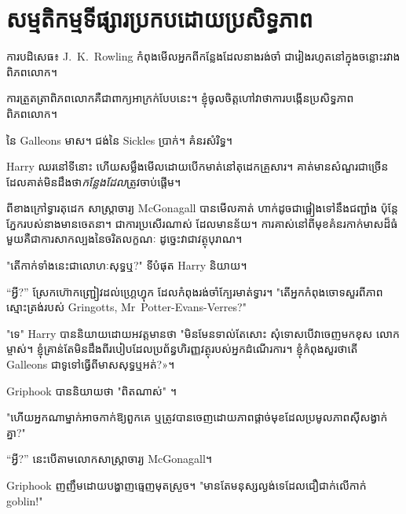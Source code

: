 \chapter[សម្មតិកម្មទីផ្សារប្រកបដោយប្រសិទ្ធភាព]{សម្មតិកម្មទីផ្សារប្រកបដោយប្រសិទ្ធភាព\protect\authorsnotefootnotemark}

\begin{chapterOpeningAuthorNote}
ការបដិសេធ៖ J.~K.~Rowling កំពុងមើលអ្នកពីកន្លែងដែលនាងរង់ចាំ ជារៀងរហូតនៅក្នុងចន្លោះរវាងពិភពលោក។
\end{chapterOpeningAuthorNote}
\begin{chapterOpeningQuote}
ការត្រួតត្រាពិភពលោកគឺជាពាក្យអាក្រក់បែបនេះ។ ខ្ញុំចូលចិត្តហៅវាថាការបង្កើនប្រសិទ្ធភាពពិភពលោក។
\end{chapterOpeningQuote}


 នៃ Galleons មាស។ ជង់នៃ Sickles ប្រាក់។ គំនរសំរិទ្ធ។

\hplettrineextrapara
Harry ឈរ​នៅ​ទី​នោះ ហើយ​សម្លឹង​មើល​ដោយ​បើក​មាត់​នៅ​តុដេក​គ្រួសារ។ គាត់មានសំណួរជាច្រើនដែលគាត់មិនដឹងថា\emph{កន្លែងដែល}ត្រូវចាប់ផ្តើម។

ពីខាងក្រៅទ្វារតុដេក សាស្ត្រាចារ្យ McGonagall បានមើលគាត់ ហាក់ដូចជាផ្អៀងទៅនឹងជញ្ជាំង ប៉ុន្តែភ្នែករបស់នាងមានចេតនា។ ជាការប្រសើរណាស់ ដែលមានន័យ។ ការ​គាស់​នៅ​ពី​មុខ​គំនរ​កាក់​មាស​ដ៏​ធំ​មួយ​គឺ​ជា​ការ​សាកល្បង​នៃ​ចរិត​លក្ខណៈ ដូច្នេះ​វា​ជា​វត្ថុ​បុរាណ។

"តើកាក់ទាំងនេះជាលោហៈសុទ្ធឬ?" ទីបំផុត Harry និយាយ។

“អ្វី?” ស្រែក​ហ៊ោ​កញ្ជ្រៀវ​ដល់​ហ្គ្រេហ្វុក ដែល​កំពុង​រង់​ចាំ​ក្បែរ​មាត់​ទ្វារ។ "តើអ្នកកំពុងចោទសួរពីភាពស្មោះត្រង់របស់ Gringotts, Mr~Potter-Evans-Verres?"

"ទេ" Harry បាននិយាយដោយអវត្តមានថា "មិនមែនទាល់តែសោះ សុំទោសបើវាចេញមកខុស លោកម្ចាស់។ ខ្ញុំគ្រាន់តែមិនដឹងពីរបៀបដែលប្រព័ន្ធហិរញ្ញវត្ថុរបស់អ្នកដំណើរការ។ ខ្ញុំកំពុងសួរថាតើ Galleons ជាទូទៅធ្វើពីមាសសុទ្ធឬអត់?»។

Griphook បាននិយាយថា "ពិតណាស់" ។

"ហើយអ្នកណាម្នាក់អាចកាក់ឱ្យពួកគេ ឬត្រូវបានចេញដោយភាពផ្តាច់មុខដែលប្រមូលភាពស៊ីសង្វាក់គ្នា?"

“អ្វី?” នេះ​បើ​តាម​លោក​សាស្ត្រាចារ្យ McGonagall។

Griphook ញញឹមដោយបង្ហាញធ្មេញមុតស្រួច។ "មានតែមនុស្សល្ងង់ទេដែលជឿជាក់លើកាក់ goblin!"

